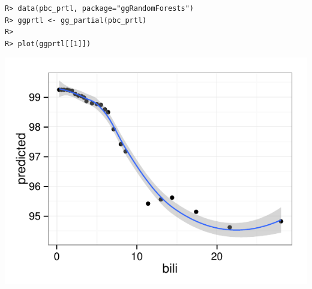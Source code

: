 \documentclass[nojss,letterpaper]{jss}\usepackage[]{graphicx}\usepackage[]{color}
\makeatletter
\def\maxwidth{ %
  \ifdim\Gin@nat@width>\linewidth
    \linewidth
  \else
    \Gin@nat@width
  \fi
}
\newenvironment{kframe}{%
 \def\at@end@of@kframe{}%
 \ifinner\ifhmode%
  \def\at@end@of@kframe{\end{minipage}}%
  \begin{minipage}{\columnwidth}%
 \fi\fi%
 \def\FrameCommand##1{\hskip\@totalleftmargin \hskip-\fboxsep
 \colorbox{shadecolor}{##1}\hskip-\fboxsep
     \hskip-\linewidth \hskip-\@totalleftmargin \hskip\columnwidth}%
 \MakeFramed {\advance\hsize-\width
   \@totalleftmargin\z@ \linewidth\hsize
   \@setminipage}}%
 {\par\unskip\endMakeFramed%
 \at@end@of@kframe}
\newenvironment{knitrout}{}{} %
\makeatother
\begin{document}
\begin{knitrout}\footnotesize
{}\color{fgcolor}\begin{kframe}
\begin{verbatim}
R> data(pbc_prtl, package="ggRandomForests")
R> ggprtl <- gg_partial(pbc_prtl)
R> 
R> plot(ggprtl[[1]])
\end{verbatim}
\end{kframe}

{\centering \includegraphics[width=\maxwidth]{figure/vig-pbc-partial-bili-1} 

}



\end{knitrout}
\end{document}
